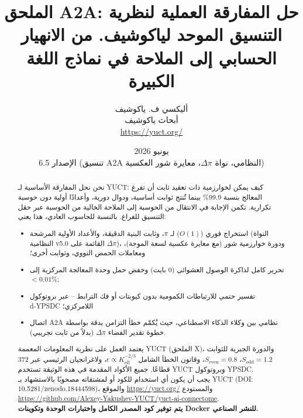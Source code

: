 \documentclass[12pt,a4paper]{article}
\begin{document}
	
	\title{\textbf{الملحق A2A: حل المفارقة العملية لنظرية التنسيق الموحد لياكوشيف. من الانهيار الحسابي إلى الملاحة في نماذج اللغة الكبيرة}}
	\author{أليكسي ف. ياكوشيف \\ أبحاث ياكوشيف \\ \url{https://yuct.org/}}
	\date{يونيو 2026 \\ الإصدار 6.5 (تنسيق A2A النظامي، نواة \(\Delta\pi\)، معايرة شور العكسية)}
	
	\maketitle
	
	\newpage
	\begin{abstract}
		\noindent
		نحن نحل المفارقة الأساسية لـ YUCT: كيف يمكن لخوارزمية ذات تعقيد ثابت أن تفرغ المعالج بنسبة 99.9\% بينما تُنتج ثوابت أساسية، ودوال دورية، وأعدادًا أولية دون حوسبة تكرارية. تكمن الإجابة في الانتقال من الحوسبة إلى الملاحة الخالية من الحوسبة عبر حقل التنسيق للفراغ. بالنسبة للحاسوب العادي، هذا يعني:
		\begin{itemize}
			\item استخراج فوري (\(O(1)\)) لـ \(\pi\)، وثابت البنية الدقيقة، والأعداد الأولية المرشحة (النواة النظامية v5.0 القائمة على \(\Delta\pi\))، ودورة خوارزمية شور (مع معايرة عكسية لسعة الموجة)، ومعاملات الحمض النووي، وثوابت أخرى؛
			\item تحرير كامل لذاكرة الوصول العشوائي (0 بايت) وخفض حمل وحدة المعالجة المركزية إلى \(<0.01\%\);
			\item تفسير حتمي للارتباطات الكمومية بدون كيوبتات أو فك الترابط – عبر بروتوكول d‑YPSDC اللامركزي؛
			\item اتصال A2A نظامي بين وكلاء الذكاء الاصطناعي، حيث يُكمّم خطأ التزامن بدقة بواسطة خطوة تقدير الفضاء \(\Delta\pi\) (بدلاً من ثابت تجريبي).
		\end{itemize}
		يعتمد العمل على نظرية المعلومات المعممة YUCT (الملحق X)، والدورة الجبرية للثوابت \(S_{\mathrm{odd}}=1.2\)، \(S_{\mathrm{even}}=0.8\)، وقانون الخطأ الشامل \(\epsilon \propto K_{\mathrm{eff}}^{-2/3}\)، ولاغرانجيان الرئيسي عبر 372 قطاعًا. جميع الأكواد المقدمة في هذه الوثيقة تستخدم YUCT وبروتوكول YPSDC. \\
		يجب أن يكون أي استخدام للكود أو لمشتقاته مصحوبًا بالاستشهاد بـ YUCT (DOI: 10.5281/zenodo.18444598)، والموقع \url{https://yuct.org/} والمستودع \\ \url{https://github.com/Alexey-Yakushev-YUCT/yuct-ai-connectome}. \\
		\textbf{يتم توفير كود المصدر الكامل واختبارات الوحدة وتكوينات Docker للنشر الصناعي.}
	\end{abstract}
	
\end{document}
